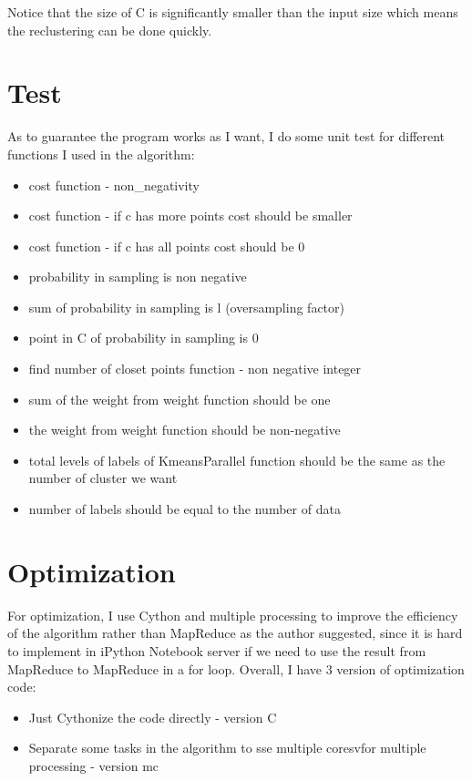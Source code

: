 \documentclass{article}
\begin{document}
Notice that the size of C is significantly smaller than the input size which means the reclustering can be done quickly. 

\section{Test}

As to guarantee the program works as I want, I do some unit test for different functions I used in the algorithm:

\begin{itemize}
  \item cost function - non_negativity
  \item cost function - if c has more points cost should be smaller
  \item cost function - if c has all points cost should be 0
  \item probability in sampling is non negative
  \item sum of probability in sampling is l (oversampling factor)
  \item point in C of probability in sampling is 0
  \item find number of closet points function - non negative integer
  \item sum of the weight from weight function should be one
  \item the weight from weight function should be non-negative
  \item total levels of labels of KmeansParallel function should be the same as the number of cluster we want
  \item number of labels should be equal to the number of data
\end{itemize}


\section{Optimization}

For optimization, I use Cython and multiple processing to improve the efficiency of the algorithm rather than MapReduce as the author suggested, since it is hard to implement in iPython Notebook server if we need to use the result from MapReduce to MapReduce in a for loop. Overall, I have 3 version of optimization code:

\begin{itemize}
  \item Just Cythonize the code directly - version C
  \item Separate some tasks in the algorithm to sse multiple coresvfor multiple processing - version mc
\end{itemize}
\end{document}
